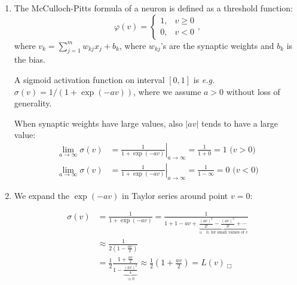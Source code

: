 \documentclass{exercise}
\begin{document}
\begin{enumerate}
  \begin{solution}

    \begin{enumerate}
    
    \item The McCulloch-Pitts formula of a neuron is
      defined as a threshold function:
      \begin{equation}
        \varphi(v) = \left\{ \begin{array}{rl} 1, & v \geq 0 \\ 0, & v <
            0 \end{array} \right.,
      \end{equation}
      where $v_k = \sum_{j=1}^{m} w_{kj} x_j + b_k$, where $w_{kj}$'s are
      the synaptic weights and $b_k$ is the bias.
      
      A sigmoid activation function on interval $[0,1]$ is {\em e.g.}
      $\sigma(v) = 1 / (1 + \exp(-av))$, where we assume $a > 0$ without
      loss of generality.
      
      When synaptic weights have large values, also $|a v|$ tends to have
      a large value:
      \begin{equation}
        \begin{aligned}
          \lim_{a \rightarrow \infty} \sigma(v)& = \left. \frac{1}{1 +
              \exp(-av)}\right|_{a \rightarrow \infty} = \frac{1}{1+0} = 1 \mbox{\ \ \ \ \ \ ($v>0$)}
          \\
          \lim_{a \rightarrow \infty} \sigma(v)& = \left. \frac{1}{1 +
              \exp(-av)}\right|_{a \rightarrow \infty} =
          \frac{1}{1-\infty} = 0 \mbox{\ \ \ \ \ ($v<0$)}
        \end{aligned}
      \end{equation}
      
    \item We expand the $\exp(-av)$ in Taylor series around point $v=0$:
      
      \begin{equation}
        \begin{split}
          \sigma(v) &= \frac{1}{1 + \exp(-av)} = \frac{1}{1 + 1 - av +
            \underbrace{\frac{(av)^2}{2!} - \frac{(av)^3}{3!} +
              \cdots}_{\mbox{$\approx$ $0$, for small values of $v$}}} \\ 
          &\approx \frac{1}{2 ( 1 - \frac{av}{2})} \\
          &= \frac{1}{2} \frac{1 + \frac{av}{2}} {1 -
            \underbrace{\frac{(av)^2}{4}}_{\approx 0}} \approx \frac{1}{2}
          \left(1 + \frac{av}{2} \right) = L(v) \: _\Box
        \end{split}
      \end{equation}
      

\end{enumerate}
\end{solution}
\end{enumerate}
\end{document}

